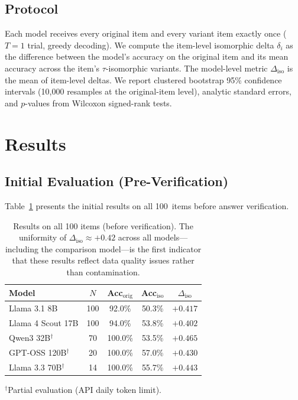 \subsection{Protocol}
Each model receives every original item and every variant item exactly
once ($T = 1$ trial, greedy decoding). We compute the item-level
isomorphic delta $\delta_i$ as the difference between the model's
accuracy on the original item and its mean accuracy across the item's
$\tau$-isomorphic variants. The model-level metric
$\Delta_{\mathrm{iso}}$ is the mean of item-level deltas. We report
clustered bootstrap 95\% confidence intervals (10{,}000 resamples at
the original-item level), analytic standard errors, and $p$-values
from Wilcoxon signed-rank tests.


\section{Results}
\label{sec:results}

\subsection{Initial Evaluation (Pre-Verification)}
\label{sec:initial}

Table~\ref{tab:unverified} presents the initial results on all
100~items before answer verification.

\begin{table}[h]
\centering
\small
\caption{Results on all 100 items (before verification). The uniformity
of $\Delta_{\mathrm{iso}} \approx +0.42$ across all models---including
the comparison model---is the first indicator that these results
reflect data quality issues rather than contamination.}
\label{tab:unverified}
\begin{tabular}{lcccc}
\toprule
Model & $N$ & Acc$_{\mathrm{orig}}$ & Acc$_{\mathrm{iso}}$ & $\Delta_{\mathrm{iso}}$ \\
\midrule
Llama 3.1 8B & 100 & 92.0\% & 50.3\% & $+0.417$ \\
Llama 4 Scout 17B & 100 & 94.0\% & 53.8\% & $+0.402$ \\
Qwen3 32B$^\dagger$ & 70 & 100.0\% & 53.5\% & $+0.465$ \\
GPT-OSS 120B$^\dagger$ & 20 & 100.0\% & 57.0\% & $+0.430$ \\
Llama 3.3 70B$^\dagger$ & 14 & 100.0\% & 55.7\% & $+0.443$ \\
\bottomrule
\end{tabular}
\vspace{1mm}
{\footnotesize $^\dagger$Partial evaluation (API daily token limit).}
\end{table}

